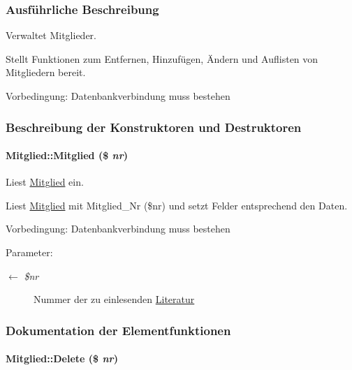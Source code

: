 \subsubsection{Ausf\"{u}hrliche Beschreibung}
Verwaltet Mitglieder. 

Stellt Funktionen zum Entfernen, Hinzufügen, Ändern und Auflisten von Mitgliedern bereit. \begin{Desc}
\item[Vorbedingung:]Datenbankverbindung muss bestehen \end{Desc}




\subsubsection{Beschreibung der Konstruktoren und Destruktoren}
\hypertarget{classMitglied_0ee18db6476bcb6d71d30978eb69c7ae}{
\paragraph[Mitglied]{\setlength{\rightskip}{0pt plus 5cm}Mitglied::Mitglied (\$ {\em nr})}\hfill}
\label{classMitglied_0ee18db6476bcb6d71d30978eb69c7ae}


Liest \hyperlink{classMitglied}{Mitglied} ein. 

Liest \hyperlink{classMitglied}{Mitglied} mit Mitglied\_\-Nr (\$nr) und setzt Felder entsprechend den Daten. \begin{Desc}
\item[Vorbedingung:]Datenbankverbindung muss bestehen \end{Desc}
\begin{Desc}
\item[Parameter:]
\begin{description}
\item[\mbox{$\leftarrow$} {\em \$nr}]Nummer der zu einlesenden \hyperlink{classLiteratur}{Literatur} \end{description}
\end{Desc}


\subsubsection{Dokumentation der Elementfunktionen}
\hypertarget{classMitglied_c6900c12663e9b228bf9942fc045b8b4}{
\paragraph[Delete]{\setlength{\rightskip}{0pt plus 5cm}Mitglied::Delete (\$ {\em nr})}\hfill}
\label{classMitglied_c6900c12663e9b228bf9942fc045b8b4}


